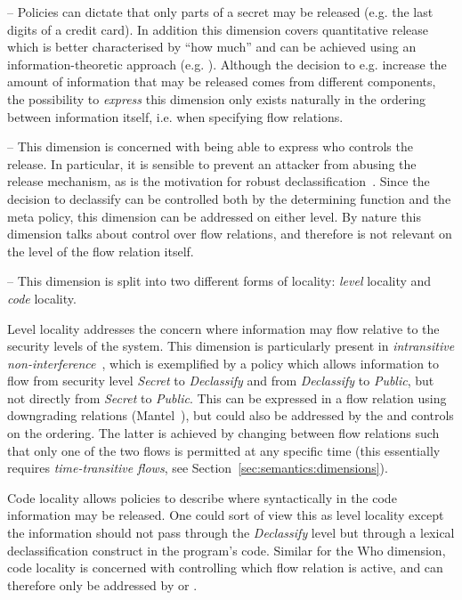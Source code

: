  -- 
Policies can dictate that only parts of a secret may be released (e.g. the last digits of a credit card). 
In addition this dimension covers quantitative release which is better characterised by ``how much'' and can be achieved using an information-theoretic approach (e.g. \cite{Clark+:ENTCS}).
Although the decision to e.g. increase the amount of information that may be released comes from different components, the possibility to \emph{express} this dimension only exists naturally in the ordering between information itself, i.e.
when specifying flow relations.


 -- 
This dimension is concerned with being able to express who controls the release.
In particular, it is sensible to prevent an attacker from abusing the release mechanism, 
as is the motivation for robust declassification~\cite{Zdancewic:Myers:CSFW01}.
Since the decision to declassify can be controlled both by the determining function 
and the meta policy, this dimension can be addressed on either level.
By nature this dimension talks about control over flow relations, and therefore 
is not relevant on the level of the flow relation itself.


 --
This dimension is split into two different forms of locality: \emph{level} locality and \emph{code} locality.

Level locality addresses the concern where information may flow relative to the security levels of the system.
This dimension is particularly present in \emph{intransitive non-interference}~\cite{Rushby:92}, which is exemplified by a policy which allows information to flow from security level {\it Secret} to {\it Declassify} and from {\it Declassify} to {\it Public}, but not directly from {\it Secret} to {\it Public}.
This can be expressed in a flow relation using downgrading relations (Mantel~\cite{Mantel:FME01}),
but could also be addressed by the \dynamicpol{} and \metapol{} controls on the ordering.
The latter is achieved by changing between flow relations such that only one of the two flows is
permitted at any specific time (this essentially requires \emph{time-transitive flows},
see Section~\ref{sec:semantics:dimensions}).

Code locality allows policies to describe where syntactically in the code information may be released.
One could sort of view this as level locality except the information should not pass through the 
{\it Declassify} level but through a lexical declassification construct in the program's code.
Similar for the Who dimension, code locality is concerned with controlling which flow relation is active, 
and can therefore only be addressed by \dynamicpol{} or \metapol{}.

